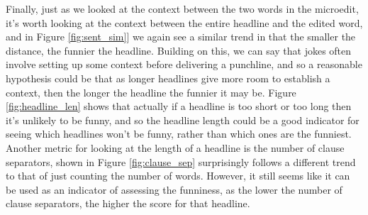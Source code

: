 \documentclass[11pt,a4paper]{article}
\begin{document}
Finally, just as we looked at the context between the two words in the microedit, it’s worth looking at the context between the entire headline and the edited word, and in Figure \ref{fig:sent_sim}] we again see a similar trend in that the smaller the distance, the funnier the headline. Building on this, we can say that jokes often involve setting up some context before delivering a punchline, and so a reasonable hypothesis could be that as longer headlines give more room to establish a context, then the longer the headline the funnier it may be. Figure \ref{fig:headline_len} shows that actually if a headline is too short or too long then it’s unlikely to be funny, and so the headline length could be a good indicator for seeing which headlines won’t be funny, rather than which ones are the funniest. Another metric for looking at the length of a headline is the number of clause separators, shown in Figure \ref{fig:clause_sep} surprisingly follows a different trend to that of just counting the number of words. However, it still seems like it can be used as an indicator of assessing the funniness, as the lower the number of clause separators, the higher the score for that headline.
\end{document}
